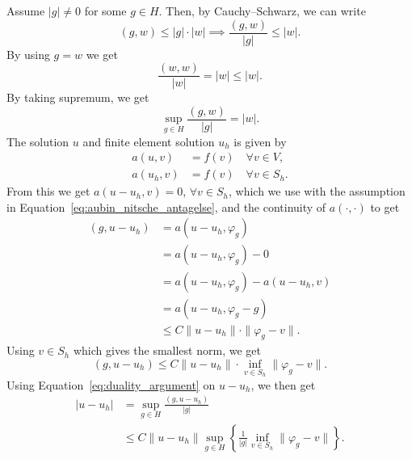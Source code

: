 \begin{bev}
    Assume $|g|\neq 0$ for some $g\in H$. Then,
    by Cauchy–Schwarz, we can write 
    \begin{equation*}
        (g,w) \leq |g| \cdot |w| \implies \frac{(g,w)}{|g|} \leq |w|.
    \end{equation*}
    By using $g=w$ we get 
    \begin{equation*}
        \frac{(w,w)}{|w|} = |w| \leq |w|.
    \end{equation*}
    By taking supremum, we get
    \begin{equation}
        \sup_{g\in H} \frac{(g,w)}{|g|} = |w|. \label{eq:duality_argument}
    \end{equation}
    The solution $u$ and finite element solution $u_h$ is given by 
    \begin{align*}
        a(u,v) &= f(v) \quad \forall v \in V, \\
        a(u_h,v) &= f(v) \quad \forall v \in S_h.
    \end{align*}
    From this we get $a(u-u_h,v)=0$, $\forall v\in S_h$, which we use with the assumption in 
    Equation~\eqref{eq:aubin_nitsche_antagelse}, and the continuity of $a(\cdot,\cdot)$ to get
    \begin{align*}
        (g,u-u_h) &= a(u-u_h,\varphi _g) \\
                  &= a(u-u_h,\varphi _g) -0 \\
                  &=a(u-u_h,\varphi _g) -a(u-u_h,v) \\
                  &=a(u-u_h, \varphi_g -g) \\
                  &\leq C \|u-u_h\| \cdot \|\varphi_g-v\|.
    \end{align*}
    Using $v\in S_h$ which gives the smallest norm, we get 
    \begin{equation*}
        (g,u-u_h) \leq C \|u-u_h\| \cdot \inf_{v\in S_h} \|\varphi_g-v\|.
    \end{equation*}
    Using Equation~\ref{eq:duality_argument} on $u-u_h$, we then get 
    \begin{align*}
        |u-u_h| &= \sup_{g\in H} \frac{(g,u-u_h)}{|g|} \\
        &\leq C \| u-u_h\| \sup_{g\in H} \left \{ \frac{1}{|g|} \inf_{v \in S_h} \|\varphi_g - v\| \right \}.
    \end{align*}
\end{bev}